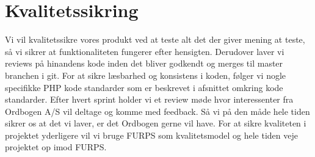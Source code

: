 \section{Kvalitetssikring}
Vi vil kvalitetssikre vores produkt ved at teste alt det der giver mening at teste,
så vi sikrer at funktionaliteten fungerer efter hensigten. Derudover laver vi reviews på hinandens kode inden
det bliver godkendt og merges til master branchen i git.
For at sikre læsbarhed og konsistens i koden, følger vi nogle specifikke PHP kode standarder som er beskrevet i afsnittet omkring kode standarder.
Efter hvert sprint holder vi et review møde hvor interessenter fra Ordbogen A/S vil deltage og komme med feedback.
Så vi på den måde hele tiden sikrer os at det vi laver, er det Ordbogen gerne vil have.
For at sikre kvaliteten i projektet yderligere vil vi bruge FURPS som kvalitetsmodel og hele tiden
veje projektet op imod FURPS.

